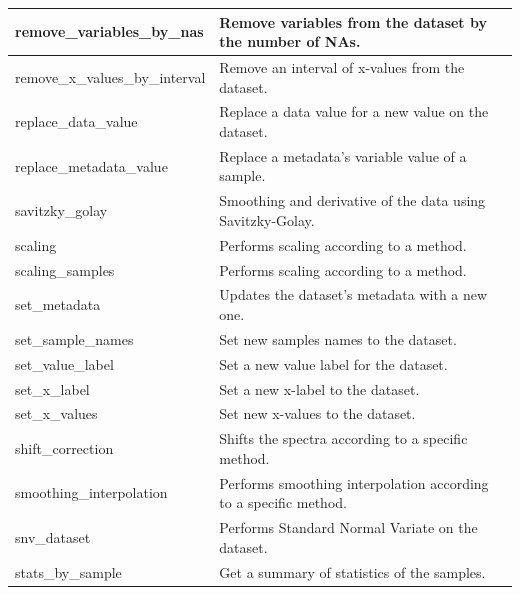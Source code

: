 \begin{scriptsize}
\begin{longtable}{|m{4.3cm}|m{11cm}|}
		\hline
		remove\_variables\_by\_nas & Remove variables from the dataset by the number of NAs. \\
		
		\hline
		remove\_x\_values\_by\_interval & Remove an interval of x-values from the dataset. \\
		
		\hline
		replace\_data\_value & Replace a data value for a new value on the dataset. \\
		
		\hline
		replace\_metadata\_value & Replace a metadata’s variable value of a sample. \\
		
		\hline
		savitzky\_golay & Smoothing and derivative of the data using Savitzky-Golay. \\
		
		\hline
		scaling & Performs scaling according to a method. \\
		
		\hline
		scaling\_samples & Performs scaling according to a method. \\
		
		\hline
		set\_metadata & Updates the dataset’s metadata with a new one. \\
		
		\hline
		set\_sample\_names & Set new samples names to the dataset. \\
		
		\hline
		set\_value\_label & Set a new value label for the dataset. \\
		
		\hline
		set\_x\_label & Set a new x-label to the dataset. \\
		
		\hline
		set\_x\_values & Set new x-values to the dataset. \\
		
		\hline
		shift\_correction & Shifts the spectra according to a specific method. \\
		
		\hline
		smoothing\_interpolation & Performs smoothing interpolation according to a specific method. \\
		
		\hline
		snv\_dataset & Performs Standard Normal Variate on the dataset. \\
		
		\hline
		stats\_by\_sample & Get a summary of statistics of the samples. \\
		

\end{longtable}
\end{scriptsize}
